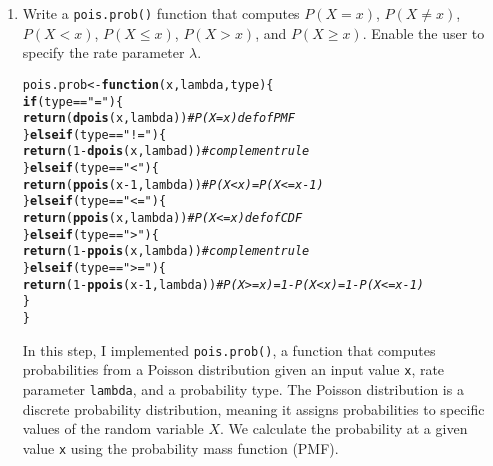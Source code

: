 \documentclass{article}\usepackage[]{graphicx}\usepackage[]{xcolor}
\makeatletter
\newcommand{\hlnum}[1]{\textcolor[rgb]{0.686,0.059,0.569}{#1}}%
\newcommand{\hlsng}[1]{\textcolor[rgb]{0.192,0.494,0.8}{#1}}%
\newcommand{\hlcom}[1]{\textcolor[rgb]{0.678,0.584,0.686}{\textit{#1}}}%
\newcommand{\hlopt}[1]{\textcolor[rgb]{0,0,0}{#1}}%
\newcommand{\hldef}[1]{\textcolor[rgb]{0.345,0.345,0.345}{#1}}%
\newcommand{\hlkwa}[1]{\textcolor[rgb]{0.161,0.373,0.58}{\textbf{#1}}}%
\newcommand{\hlkwb}[1]{\textcolor[rgb]{0.69,0.353,0.396}{#1}}%
\newcommand{\hlkwc}[1]{\textcolor[rgb]{0.333,0.667,0.333}{#1}}%
\newcommand{\hlkwd}[1]{\textcolor[rgb]{0.737,0.353,0.396}{\textbf{#1}}}%
\newenvironment{kframe}{%
 \def\at@end@of@kframe{}%
 \ifinner\ifhmode%
  \def\at@end@of@kframe{\end{minipage}}%
  \begin{minipage}{\columnwidth}%
 \fi\fi%
 \def\FrameCommand##1{\hskip\@totalleftmargin \hskip-\fboxsep
 \colorbox{shadecolor}{##1}\hskip-\fboxsep
     \hskip-\linewidth \hskip-\@totalleftmargin \hskip\columnwidth}%
 \MakeFramed {\advance\hsize-\width
   \@totalleftmargin\z@ \linewidth\hsize
   \@setminipage}}%
 {\par\unskip\endMakeFramed%
 \at@end@of@kframe}
\newenvironment{knitrout}{}{} %
\makeatother
\begin{document}
  \begin{enumerate}
    \item Write a \texttt{pois.prob()} function that computes $P(X=x)$, 
    $P(X \neq x)$, $P(X<x)$, $P(X \leq x)$, $P(X > x)$, and $P(X \geq x).$ Enable the user to specify the rate parameter $\lambda$.
\begin{knitrout}\scriptsize
{}\color{fgcolor}\begin{kframe}
\begin{alltt}
\hldef{pois.prob} \hlkwb{<-} \hlkwa{function}\hldef{(}\hlkwc{x}\hldef{,} \hlkwc{lambda}\hldef{,} \hlkwc{type}\hldef{)\{}
  \hlkwa{if} \hldef{(type} \hlopt{==} \hlsng{"="}\hldef{)\{}
    \hlkwd{return} \hldef{(}\hlkwd{dpois}\hldef{(x, lambda))} \hlcom{#P(X=x) def of PMF}
  \hldef{\}} \hlkwa{else if} \hldef{(type}\hlopt{==} \hlsng{"!="}\hldef{) \{}
    \hlkwd{return} \hldef{(}\hlnum{1} \hlopt{-} \hlkwd{dpois}\hldef{(x, lambad))} \hlcom{# complement rule }
  \hldef{\}} \hlkwa{else if} \hldef{(type}\hlopt{==} \hlsng{"<"}\hldef{)\{}
    \hlkwd{return}\hldef{(}\hlkwd{ppois}\hldef{(x}\hlopt{-}\hlnum{1}\hldef{, lambda))}  \hlcom{# P(X < x) = P(X <= x-1)}
  \hldef{\}} \hlkwa{else if} \hldef{(type} \hlopt{==} \hlsng{"<="}\hldef{) \{}
    \hlkwd{return}\hldef{(}\hlkwd{ppois}\hldef{(x, lambda))} \hlcom{# P (X < = x) def of CDF}
  \hldef{\}} \hlkwa{else if} \hldef{(type} \hlopt{==} \hlsng{">"}\hldef{) \{}
    \hlkwd{return}\hldef{(}\hlnum{1} \hlopt{-} \hlkwd{ppois}\hldef{(x, lambda))} \hlcom{# complement rule}
  \hldef{\}} \hlkwa{else if} \hldef{(type} \hlopt{==} \hlsng{">="}\hldef{)\{}
    \hlkwd{return}\hldef{(}\hlnum{1} \hlopt{-} \hlkwd{ppois}\hldef{(x}\hlopt{-}\hlnum{1}\hldef{, lambda))} \hlcom{# P (X >= x) = 1 - P(X<x) = 1 - P(X <= x-1)}
  \hldef{\}}
\hldef{\}}
\end{alltt}
\end{kframe}
\end{knitrout}
In this step, I implemented \texttt{pois.prob()}, a function that computes 
probabilities from a Poisson distribution given an input value \texttt{x},
rate parameter \texttt{lambda}, and a probability type. The Poisson distribution
is a discrete probability distribution, meaning it assigns probabilities
to specific values of the random variable $X$. We calculate the probability
at a given value \texttt{x} using the probability mass function (PMF).



\end{enumerate}
\end{document}
